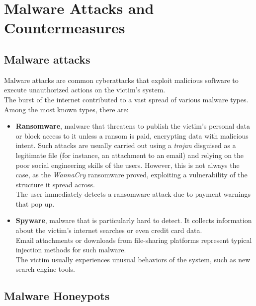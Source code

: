 \section{Malware Attacks and Countermeasures}
\subsection{Malware attacks}
Malware attacks are common cyberattacks that exploit malicious software to execute unauthorized actions on the victim's system.\\
The burst of the internet contributed to a vast spread of various malware types. Among the most known types, there are:
\begin{itemize}
\item \textbf{Ransomware}, malware that threatens to publish the victim's personal data or block access to it unless a ransom is paid, encrypting data with malicious intent. Such attacks are usually carried out using a \textit{trojan} disguised as a legitimate file (for instance, an attachment to an email) and relying on the poor social engineering skills of the users. However, this is not always the case, as the \textit{WannaCry} ransomware proved, exploiting a vulnerability of the structure it spread across.\\
The user immediately detects a ransomware attack due to payment warnings that pop up.
\item \textbf{Spyware}, malware that is particularly hard to detect. It collects information about the victim's internet searches or even credit card data.\\
Email attachments or downloads from file-sharing platforms represent typical injection methods for such malware.\\
The victim usually experiences unusual behaviors of the system, such as new search engine tools.
\end{itemize}
\subsection{Malware Honeypots}


